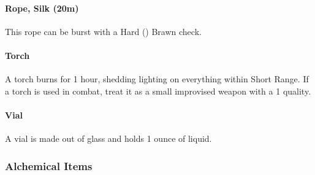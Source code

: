 \begin{multicols}{2}
\paragraph{Rope, Silk (20m)} \label{advitm:rope_silk}
This rope can be burst with a Hard (\difficulty\difficulty\difficulty\setback)
Brawn check.

\paragraph{Torch} \label{advitm:torch}
A torch burns for 1 hour, shedding lighting on
everything within Short Range.
If a torch is used in combat, treat it as a small
improvised weapon with a  1 quality.

\paragraph{Vial} \label{advitm:vial}
A vial is made out of glass and holds 1 ounce of liquid.

\end{multicols}
\hrulefill

\subsubsection{Alchemical Items}


